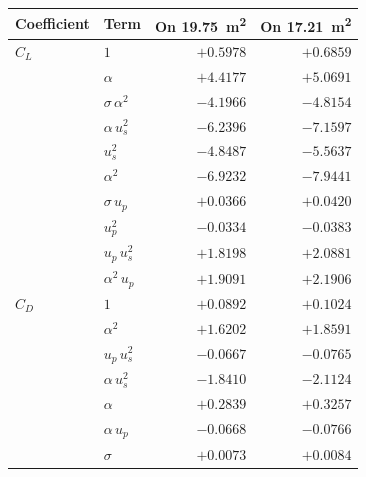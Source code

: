\begin{tabular}{llrr}
\toprule
Coefficient & Term & On \SI{19.75}{\square\metre} & On \SI{17.21}{\square\metre} \\
\midrule
$C_L$ & $1$ & $+0.5978$ & $+0.6859$ \\
 & $\alpha$ & $+4.4177$ & $+5.0691$ \\
 & $\sigma\,\alpha^{2}$ & $-4.1966$ & $-4.8154$ \\
 & $\alpha\,u_s^{2}$ & $-6.2396$ & $-7.1597$ \\
 & $u_s^{2}$ & $-4.8487$ & $-5.5637$ \\
 & $\alpha^{2}$ & $-6.9232$ & $-7.9441$ \\
 & $\sigma\,u_p$ & $+0.0366$ & $+0.0420$ \\
 & $u_p^{2}$ & $-0.0334$ & $-0.0383$ \\
 & $u_p\,u_s^{2}$ & $+1.8198$ & $+2.0881$ \\
 & $\alpha^{2}\,u_p$ & $+1.9091$ & $+2.1906$ \\
\midrule
$C_D$ & $1$ & $+0.0892$ & $+0.1024$ \\
 & $\alpha^{2}$ & $+1.6202$ & $+1.8591$ \\
 & $u_p\,u_s^{2}$ & $-0.0667$ & $-0.0765$ \\
 & $\alpha\,u_s^{2}$ & $-1.8410$ & $-2.1124$ \\
 & $\alpha$ & $+0.2839$ & $+0.3257$ \\
 & $\alpha\,u_p$ & $-0.0668$ & $-0.0766$ \\
 & $\sigma$ & $+0.0073$ & $+0.0084$ \\
\bottomrule
\end{tabular}

